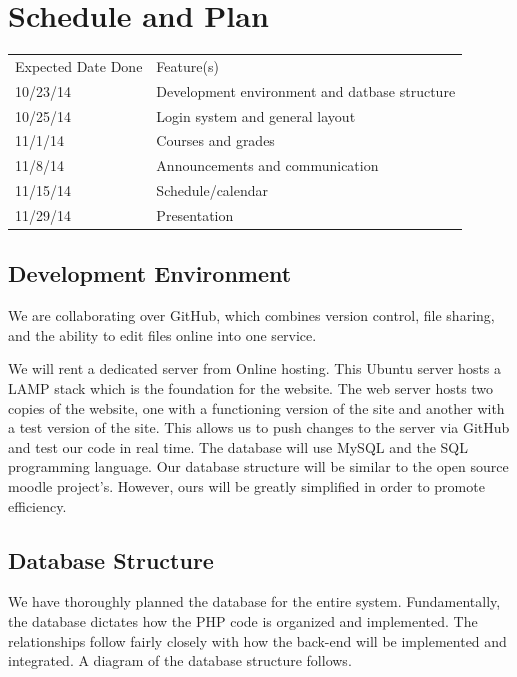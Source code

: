 \documentclass{article}
\begin{document}
\section{Schedule and Plan}

\vspace{10 pt}

\begin{tabular}{ll}
    Expected Date Done&Feature(s)\\
    10/23/14&Development environment and datbase structure\\
    10/25/14&Login system and general layout\\
    11/1/14&Courses and grades\\
    11/8/14&Announcements and communication\\
    11/15/14&Schedule/calendar\\
    11/29/14&Presentation\\
\end{tabular}

\subsection{Development Environment}

We are collaborating over GitHub, which combines version control, file sharing,
and the ability to edit files online into one service.

We will rent a dedicated server from Online hosting. This Ubuntu server hosts a
LAMP stack which is the foundation for the website. The web server hosts two
copies of the website, one with a functioning version of the site and another
with a test version of the site. This allows us to push changes to the server
via GitHub and test our code in real time. The database will use MySQL and the
SQL programming language. Our database structure will be similar to the open
source moodle project's. However, ours will be greatly simplified in order to
promote efficiency.

\subsection{Database Structure}

We have thoroughly planned the database for the entire system. Fundamentally,
the database dictates how the PHP code is organized and implemented. The
relationships follow fairly closely with how the back-end will be implemented
and integrated. A diagram of the database structure follows.
\end{document}
